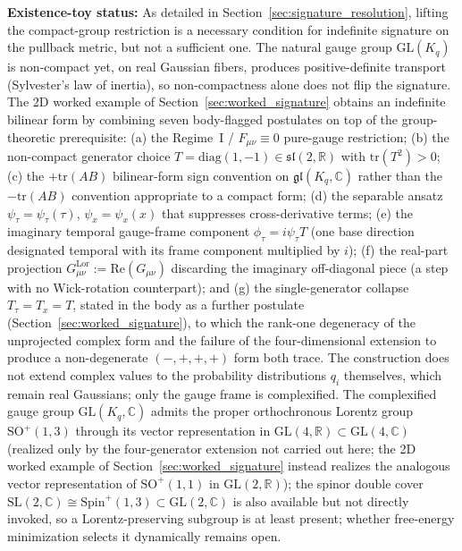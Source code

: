 \documentclass[11pt]{article}
\begin{document}
\textbf{Existence-toy status:} As detailed in Section~\ref{sec:signature_resolution}, lifting the compact-group restriction is a necessary condition for indefinite signature on the pullback metric, but not a sufficient one. The natural gauge group $\mathrm{GL}(K_q)$ is non-compact yet, on real Gaussian fibers, produces positive-definite transport (Sylvester's law of inertia), so non-compactness alone does not flip the signature. The 2D worked example of Section~\ref{sec:worked_signature} obtains an indefinite bilinear form by combining seven body-flagged postulates on top of the group-theoretic prerequisite: (a) the Regime~I / $F_{\mu\nu} \equiv 0$ pure-gauge restriction; (b) the non-compact generator choice $T = \mathrm{diag}(1,-1) \in \mathfrak{sl}(2,\mathbb{R})$ with $\mathrm{tr}(T^2) > 0$; (c) the $+\mathrm{tr}(AB)$ bilinear-form sign convention on $\mathfrak{gl}(K_q,\mathbb{C})$ rather than the $-\mathrm{tr}(AB)$ convention appropriate to a compact form; (d) the separable ansatz $\psi_\tau = \psi_\tau(\tau)$, $\psi_x = \psi_x(x)$ that suppresses cross-derivative terms; (e) the imaginary temporal gauge-frame component $\phi_\tau = i\psi_\tau T$ (one base direction designated temporal with its frame component multiplied by $i$); (f) the real-part projection $G^{\mathrm{Lor}}_{\mu\nu} := \mathrm{Re}(G_{\mu\nu})$ discarding the imaginary off-diagonal piece (a step with no Wick-rotation counterpart); and (g) the single-generator collapse $T_\tau = T_x = T$, stated in the body as a further postulate (Section~\ref{sec:worked_signature}), to which the rank-one degeneracy of the unprojected complex form and the failure of the four-dimensional extension to produce a non-degenerate $(-,+,+,+)$ form both trace. The construction does not extend complex values to the probability distributions $q_i$ themselves, which remain real Gaussians; only the gauge frame is complexified. The complexified gauge group $\mathrm{GL}(K_q,\mathbb{C})$ admits the proper orthochronous Lorentz group $\mathrm{SO}^+(1,3)$ through its vector representation in $\mathrm{GL}(4,\mathbb{R}) \subset \mathrm{GL}(4,\mathbb{C})$ (realized only by the four-generator extension not carried out here; the 2D worked example of Section~\ref{sec:worked_signature} instead realizes the analogous vector representation of $\mathrm{SO}^+(1,1)$ in $\mathrm{GL}(2,\mathbb{R})$); the spinor double cover $\mathrm{SL}(2,\mathbb{C}) \cong \mathrm{Spin}^+(1,3) \subset \mathrm{GL}(2,\mathbb{C})$ is also available but not directly invoked, so a Lorentz-preserving subgroup is at least present; whether free-energy minimization selects it dynamically remains open.
\end{document}

